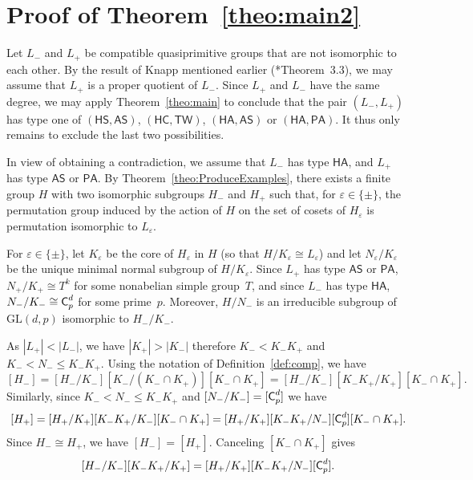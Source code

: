 \documentclass[twoside,12pt,leqno]{amsproc}
\numberwithin{table}{section}
\numberwithin{figure}{section}
\theoremstyle{plain}
\theoremstyle{definition}\newtheorem{definition}[theorem]{Definition}
\theoremstyle{definition}\newtheorem{example}[theorem]{Example}
\theoremstyle{definition}\newtheorem{construction}[theorem]{Construction}
\theoremstyle{definition}\newtheorem{remark}[theorem]{Remark}
\theoremstyle{definition}\newtheorem{problem}[theorem]{Problem}
\begin{document}
\section{Proof of Theorem~\ref{theo:main2}}\label{S1}

Let $L_-$ and $L_+$ be compatible quasiprimitive groups that are not isomorphic to each other. By the result of Knapp mentioned earlier (\cite{Knapp}*{Theorem~3.3}), we may assume that $L_+$ is a proper quotient of $L_-$. Since $L_+$ and $L_-$ have the same degree, we may apply Theorem~\ref{theo:main} to conclude that the pair $(L_-,L_+)$ has type one of $({\mathsf{HS}},{\mathsf{AS}})$, $({\mathsf{HC}},{\mathsf{TW}})$, $({\mathsf{HA}},{\mathsf{AS}})$ or $({\mathsf{HA}},{\mathsf{PA}})$. It thus only remains to exclude the last two possibilities. 

In view of obtaining a contradiction, we assume that $L_-$ has type ${\mathsf{HA}}$, and $L_+$ has type ${\mathsf{AS}}$ or ${\mathsf{PA}}$. By Theorem~\ref{theo:ProduceExamples}, there exists a finite group $H$ with two isomorphic subgroups $H_-$ and $H_+$ such that, for ${\varepsilon}\in\{\pm\}$, the permutation group induced by the action of $H$ on the set of cosets of $H_{\varepsilon}$ is permutation isomorphic to $L_{\varepsilon}$. 

For ${\varepsilon}\in\{\pm\}$, let $K_{\varepsilon}$ be the core of $H_{\varepsilon}$ in $H$ (so that $H/K_{\varepsilon}\cong L_{\varepsilon}$) and let $N_{\varepsilon}/K_{\varepsilon}$ be the unique minimal normal subgroup of $H/K_{\varepsilon}$. Since $L_+$ has type ${\mathsf{AS}}$ or ${\mathsf{PA}}$, $N_+/K_+\cong T^k$ for some nonabelian simple group~$T$, and since $L_-$ has type ${\mathsf{HA}}$, $N_-/K_-\cong {\textup{\textsf{C}}}_p^d$ for some prime~$p$. Moreover, $H/N_-$ is an irreducible subgroup of ${\mathrm{GL}}(d,p)$ isomorphic to $H_-/K_-$. 

As $|L_+|<|L_-|$, we have $|K_+|>|K_-|$ therefore $K_-< K_-K_+$ and $K_-<N_-{\leqslant} K_-K_+$. Using the notation of Definition~\ref{def:comp}, we have
$$
  [H_-]=[H_-/K_-][K_-/(K_-\cap K_+)][K_-\cap K_+]=[H_-/K_-][K_-K_+/K_+][K_-\cap K_+].
$$
Similarly, since $K_-<N_-{\leqslant} K_-K_+$ and $[N_-/K_-]=[{\textup{\textsf{C}}}_p^d]$ we have
$$
  [H_+]=[H_+/K_+][K_-K_+/K_-][K_-\cap K_+]=[H_+/K_+][K_-K_+/N_-][{\textup{\textsf{C}}}_p^d][K_-\cap K_+].
$$
Since $H_-\cong H_+$, we have $[H_-]=[H_+]$. Canceling $[K_-\cap K_+]$ gives
\begin{equation}\label{supereq}
  [H_-/K_-][K_-K_+/K_+]=[H_+/K_+][K_-K_+/N_-][{\textup{\textsf{C}}}_p^d].
\end{equation}
\end{document}

